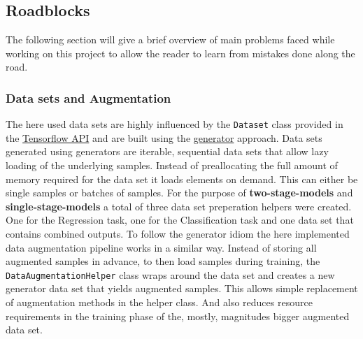 \subsection{Roadblocks}\label{subsec:roadblocks}
The following section will give a brief overview of main problems faced while working on this project to allow the reader to learn from mistakes done along the road.
\subsubsection{Data sets and Augmentation}
The here used data sets are highly influenced by the \lstinline{Dataset} class provided in the \href{https://www.tensorflow.org/api_docs/python/tf/data/Dataset}{Tensorflow API} and are built using the \href{https://www.tensorflow.org/api_docs/python/tf/data/Dataset#from_generator}{generator} approach.
Data sets generated using generators are iterable, sequential data sets that allow lazy loading of the underlying samples.
Instead of preallocating the full amount of memory required for the data set it loads elements on demand.
This can either be single samples or batches of samples.
For the purpose of \textbf{two-stage-models} and \textbf{single-stage-models} a total of three data set preperation helpers were created.
One for the Regression task, one for the Classification task and one data set that contains combined outputs.
To follow the generator idiom the here implemented data augmentation pipeline works in a similar way.
Instead of storing all augmented samples in advance, to then load samples during training, the \lstinline[language=Python]{DataAugmentationHelper} class wraps around the data set and creates a new generator data set that yields augmented samples.
This allows simple replacement of augmentation methods in the helper class.
And also reduces resource requirements in the training phase of the, mostly, magnitudes bigger augmented data set.
